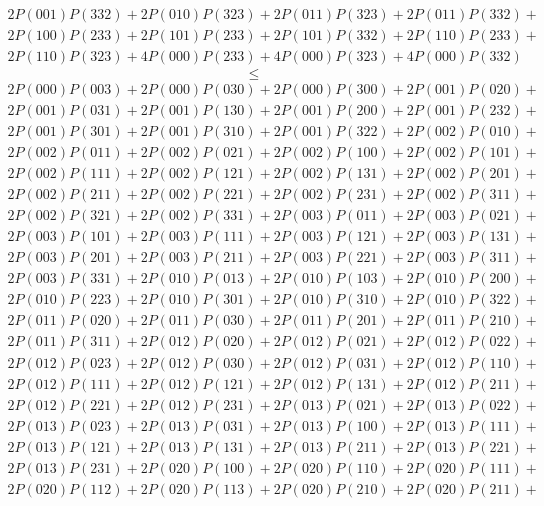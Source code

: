 \begin{align*}
	2P(001)P(332) + 2P(010)P(323) + 2P(011)P(323) + 2P(011)P(332)+ \\ 
	2P(100)P(233) + 2P(101)P(233) + 2P(101)P(332) + 2P(110)P(233)+ \\ 
	2P(110)P(323) + 4P(000)P(233) + 4P(000)P(323) + 4P(000)P(332)
\end{align*}
\[\leq\]
\begin{align*}
	2P(000)P(003) + 2P(000)P(030) + 2P(000)P(300) + 2P(001)P(020)+ \\ 
	2P(001)P(031) + 2P(001)P(130) + 2P(001)P(200) + 2P(001)P(232)+ \\ 
	2P(001)P(301) + 2P(001)P(310) + 2P(001)P(322) + 2P(002)P(010)+ \\ 
	2P(002)P(011) + 2P(002)P(021) + 2P(002)P(100) + 2P(002)P(101)+ \\ 
	2P(002)P(111) + 2P(002)P(121) + 2P(002)P(131) + 2P(002)P(201)+ \\ 
	2P(002)P(211) + 2P(002)P(221) + 2P(002)P(231) + 2P(002)P(311)+ \\ 
	2P(002)P(321) + 2P(002)P(331) + 2P(003)P(011) + 2P(003)P(021)+ \\ 
	2P(003)P(101) + 2P(003)P(111) + 2P(003)P(121) + 2P(003)P(131)+ \\ 
	2P(003)P(201) + 2P(003)P(211) + 2P(003)P(221) + 2P(003)P(311)+ \\ 
	2P(003)P(331) + 2P(010)P(013) + 2P(010)P(103) + 2P(010)P(200)+ \\ 
	2P(010)P(223) + 2P(010)P(301) + 2P(010)P(310) + 2P(010)P(322)+ \\ 
	2P(011)P(020) + 2P(011)P(030) + 2P(011)P(201) + 2P(011)P(210)+ \\ 
	2P(011)P(311) + 2P(012)P(020) + 2P(012)P(021) + 2P(012)P(022)+ \\ 
	2P(012)P(023) + 2P(012)P(030) + 2P(012)P(031) + 2P(012)P(110)+ \\ 
	2P(012)P(111) + 2P(012)P(121) + 2P(012)P(131) + 2P(012)P(211)+ \\ 
	2P(012)P(221) + 2P(012)P(231) + 2P(013)P(021) + 2P(013)P(022)+ \\ 
	2P(013)P(023) + 2P(013)P(031) + 2P(013)P(100) + 2P(013)P(111)+ \\ 
	2P(013)P(121) + 2P(013)P(131) + 2P(013)P(211) + 2P(013)P(221)+ \\ 
	2P(013)P(231) + 2P(020)P(100) + 2P(020)P(110) + 2P(020)P(111)+ \\ 
	2P(020)P(112) + 2P(020)P(113) + 2P(020)P(210) + 2P(020)P(211)+ \\ 

\end{align*}
